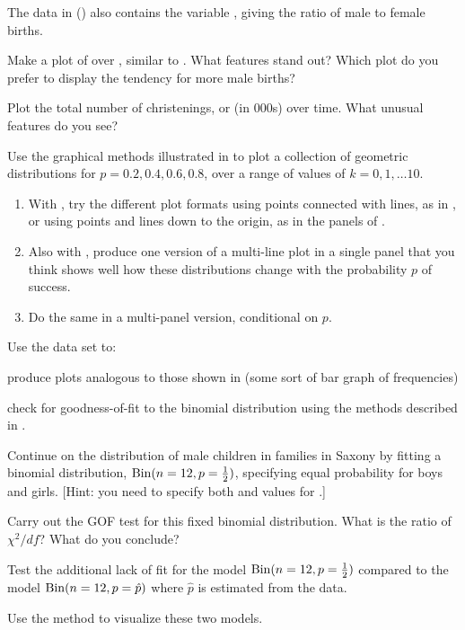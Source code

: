 \documentclass[10pt,krantz2]{krantz}\usepackage[]{graphicx}\usepackage[]{color}
\begin{document}
\begin{Exercises}
  \exercise The  data in  () also
   contains the variable
   , giving the ratio of male to female births.
	  \begin{enumerate*}
	    \item Make a plot of  over , similar to .
	    What features stand out?  Which plot do you prefer to display the tendency for
	    more male births?
	    \item Plot the total number of christenings,  or 
	    (in 000s) over time.
	    What unusual features do you see?
	  \end{enumerate*}

  \exercise Use the graphical methods illustrated in 
  to plot a collection of geometric distributions for $p = 0.2, 0.4, 0.6, 0.8$,
  over a range of values of $k = 0, 1, \dots 10$.
  \begin{enumerate}
    \item With , try the different plot formats using points
    connected with lines, as in , or using points
    and lines down to the origin, as in the panels of .
    \item Also with , produce one version of a multi-line plot
    in a single panel that you think shows well how these distributions change
    with the probability $p$ of success.
    \item Do the same in a multi-panel version, conditional on $p$.
  \end{enumerate}

  \exercise Use the data set  to:
  \begin{enumerate*}
    \item produce plots analogous to those
  shown in  (some sort of bar graph of frequencies)
    \item check for goodness-of-fit to the binomial distribution using the
     methods described in .
  \end{enumerate*}

  \exercise Continue  on the distribution of male children in families
  in Saxony by fitting a binomial distribution, $\Bin(n=12, p=\frac12)$, specifying
  equal probability for boys and girls. [Hint:  you need to specify both  and
   values for .]
  \begin{enumerate*}
    \item Carry out the GOF test for this fixed binomial distribution.
    What is the ratio of $\chi^2 / df$? What do you conclude?
    \item Test the additional lack of fit for the model $\Bin(n=12, p=\frac12)$
    compared to the model $\Bin(n=12, p=\hat{p})$ where $\hat{p}$ is estimated
    from the data.
    \item Use the  method to visualize these two models.
  \end{enumerate*}


\end{Exercises}
\end{document}

